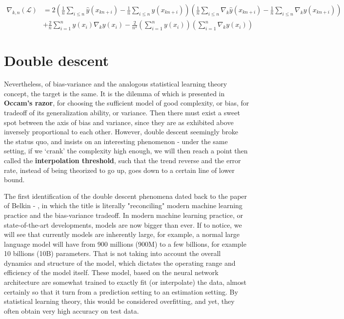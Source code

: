 \documentclass{article}
\begin{document}
\begin{align}
\nabla_{k,n}(\mathcal{L})
&= 2\left(\frac{1}{n}\sum_{i\le n}\hat{y}(x_{kn+i}) - \frac{1}{n}\sum_{i\le n}y(x_{kn+i})\right)
   \left(\frac{1}{n}\sum_{i\le n}\nabla_k\hat{y}(x_{kn+i}) - \frac{1}{n}\sum_{i\le n}\nabla_k y(x_{kn+i})\right) \\
&+ \frac{2}{n}\sum_{i=1}^n y(x_i)\nabla_k y(x_i)
   - \frac{2}{n^2}\left(\sum_{i=1}^n y(x_i)\right)\left(\sum_{i=1}^n \nabla_k y(x_i)\right)
\end{align}

\section{Double descent}

Nevertheless, of bias-variance and the analogous statistical learning theory concept, the target is the same. It is the dilemma of which is presented in \textbf{Occam's razor}, for choosing the sufficient model of good complexity, or bias, for tradeoff of its generalization ability, or variance. Then there must exist a sweet spot between the axis of bias and variance, since they are as exhibited above inversely proportional to each other. However, double descent seemingly broke the status quo, and insists on an interesting phenomenon - under the same setting, if we `crank' the complexity high enough, we will then reach a point then called the \textbf{interpolation threshold}, such that the trend reverse and the error rate, instead of being theorized to go up, goes down to a certain line of lower bound. 

The first identification of the double descent phenomena dated back to the paper of Belkin - \cite{belkin_reconciling_2019}, in which the title is literally "reconciling" modern machine learning practice and the bias-variance tradeoff. In modern machine learning practice, or state-of-the-art developments, models are now bigger than ever. If to notice, we will see that currently models are inherently large, for example, a normal large language model will have from 900 millions (900M) to a few billions, for example 10 billions (10B) parameters. That is not taking into account the overall dynamics and structure of the model, which dictates the operating range and efficiency of the model itself. These model, based on the neural network architecture are somewhat trained to exactly fit (or interpolate) the data, almost certainly so that it turn from a prediction setting to an estimation setting. By statistical learning theory, this would be considered overfitting, and yet, they often obtain very high accuracy on test data.
\end{document}

